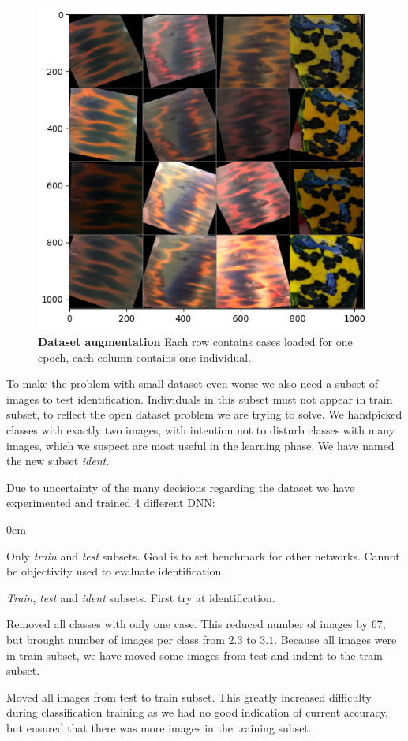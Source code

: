 \documentclass[fleqn,moreauthors,10pt]{ds_report}
\begin{document}
\begin{figure}[h]\centering
	\includegraphics[width=0.8\linewidth]{augmentation.png}
	\caption{\textbf{Dataset augmentation} Each row contains cases loaded for one epoch, each column contains one individual.}
	\label{fig:augmentation}
\end{figure}

To make the problem with small dataset even worse we also need a subset of images to test identification. Individuals in this subset must not appear in train subset, to reflect the open dataset problem we are trying to solve. We handpicked classes with exactly two images, with intention not to disturb classes with many images, which we suspect are most useful in the learning phase. We have named the new subset \textit{ident}.

Due to uncertainty of the many decisions regarding the dataset we have experimented and trained 4 different DNN:
\begin{description}
	\itemsep0em
	\item[Net 1] Only \textit{train} and \textit{test} subsets. Goal is to set benchmark for other networks. Cannot be objectivity used to evaluate identification.
	\item[Net 2] \textit{Train}, \textit{test} and \textit{ident} subsets. First try at identification. 
	\item[Net 3] Removed all classes with only one case. This reduced number of images by 67, but brought number of images per class from $2.3$ to $3.1$. Because all images were in train subset, we have moved some images from test and indent to the train subset.
	\item[Net 4] Moved all images from test to train subset. This greatly increased difficulty during classification training as we had no good indication of current accuracy, but ensured that there was more images in the training subset.
\end{description}
\end{document}
